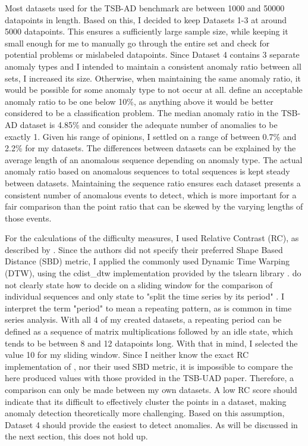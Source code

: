 \documentclass[12pt,oneside]{article}
\begin{document}
Most datasets used for the TSB-AD benchmark are between 1000 and 50000 datapoints in length. Based on this, I decided to keep Datasets 1-3 at around 5000 datapoints. This ensures a sufficiently large sample size, while keeping it small enough for me to manually go through the entire set and check for potential problems or mislabeled datapoints. Since Dataset 4 contains 3 separate anomaly types and I intended to maintain a consistent anomaly ratio between all sets, I increased its size. Otherwise, when maintaining the same anomaly ratio, it would be possible for some anomaly type to not occur at all. \cite[pp.~8]{SchmidlEtAl2022Anomaly} define an acceptable anomaly ratio to be one below 10\%, as anything above it would be better considered to be a classification problem. The median anomaly ratio in the TSB-AD dataset is 4.85\% and \cite[p.~4]{wu2021current} consider the adequate number of anomalies to be exactly 1. Given his range of opinions, I settled on a range of between 0.7\% and 2.2\% for my datasets. The differences between datasets can be explained by the average length of an anomalous sequence depending on anomaly type. The actual anomaly ratio based on anomalous sequences to total sequences is kept steady between datasets. Maintaining the sequence ratio ensures each dataset presents a consistent number of anomalous events to detect, which is more important for a fair comparison than the point ratio that can be skewed by the varying lengths of those events. \par
For the calculations of the difficulty measures, I used Relative Contrast (RC), as described by \cite[pp.~1704]{paparrizos2022tsb}. Since the authors did not specify their preferred Shape Based Distance (SBD) metric, I applied the commonly used Dynamic Time Warping (DTW), using the cdist\_dtw implementation provided by the tslearn library \parencites{DTW}. \cite[pp.~1704]{paparrizos2022tsb} do not clearly state how to decide on a sliding window for the comparison of individual sequences and only state to "split the time series by its period" \parencite[p.~1704]{paparrizos2022tsb}. I interpret the term "period" to mean a repeating pattern, as is common in time series analysis. With all 4 of my created datasets, a repeating period can be defined as a sequence of matrix multiplications followed by an idle state, which tends to be between 8 and 12 datapoints long. With that in mind, I selected the value 10 for my sliding window. Since I neither know the exact RC implementation of \cite{paparrizos2022tsb}, nor their used SBD metric, it is impossible to compare the here produced values with those provided in the TSB-UAD paper. Therefore, a comparison can only be made between my own datasets. A low RC score should indicate that its difficult to effectively cluster the points in a dataset, making anomaly detection theoretically more challenging. Based on this assumption, Dataset 4 should provide the easiest to detect anomalies. As will be discussed in the next section, this does not hold up.
\end{document}
